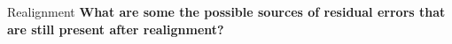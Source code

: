 \documentclass{beamer}
\begin{document}
\begin{frame}{Realignment}
  \textbf{What are some the possible sources of residual errors that are still present after realignment?}

  
\end{frame}

% 
%   
\end{document}
